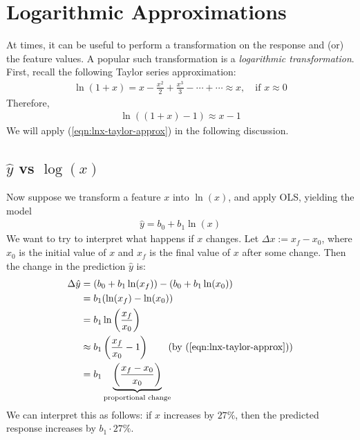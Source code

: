 \documentclass[12pt, a4paper]{article}
\theoremstyle{definition}
\begin{document}
	\section*{Logarithmic Approximations}
	At times, it can be useful to perform a transformation on the response and (or)
	the feature values. A popular such transformation is a \textit{logarithmic
	transformation}. First, recall the following Taylor series approximation:
	\begin{align*}
		\ln(1 + x) = x - \frac{x^2}{2}+\frac{x^3}{3} -\cdots+\cdots \approx x,\quad \text{if }x\approx 0
	\end{align*}
	Therefore,
	\begin{align}
		\ln((1 + x) - 1)\approx x-1 \label{eqn:lnx-taylor-approx}
	\end{align}
	We will apply (\ref{eqn:lnx-taylor-approx}) in the following discussion.
	\subsection*{$\hat{y}$ vs $\log(x)$}
	Now suppose we transform a feature $x$ into $\ln(x)$, and apply OLS, yielding
	the model
	\begin{align*}
		\hat{y} = b_0 + b_1\ln(x)
	\end{align*}
	We want to try to interpret what happens if $x$ changes. Let $\Delta x := x_f - x_0$,
	where $x_0$ is the initial value of $x$ and $x_f$ is the final value of $x$
	after some change. Then the change in the prediction $\hat{y}$ is:
	\begin{align*}
		\Delta \hat{y} &= (b_0 + b_1\ln(x_f)) - (b_0 + b_1\ln(x_0))\\
		&=b_1(\ln(x_f) - \ln(x_0))\\
		&=b_1\ln \left(\frac{x_f}{x_0}\right)\\
		&\approx b_1\left(\frac{x_f}{x_0} - 1\right)
		\tag{by (\ref{eqn:lnx-taylor-approx})}\\
		&=b_1\underbrace{\left(\frac{x_f-x_0}{x_0}\right)}_{\text{proportional change}}
	\end{align*}
	We can interpret this as follows: if $x$ increases by $27\%$, then the predicted response
	increases by $b_1\cdot 27\%$.
\end{document}
